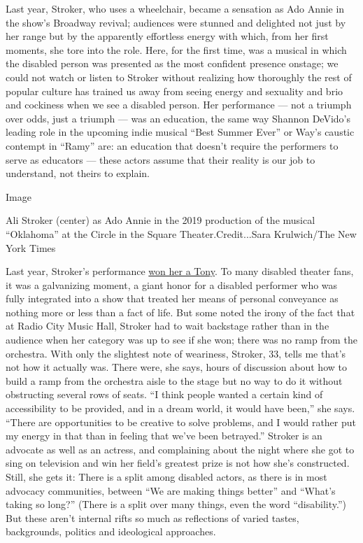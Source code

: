 Last year, Stroker, who uses a wheelchair, became a sensation as Ado
Annie in the show's Broadway revival; audiences were stunned and
delighted not just by her range but by the apparently effortless energy
with which, from her first moments, she tore into the role. Here, for
the first time, was a musical in which the disabled person was presented
as the most confident presence onstage; we could not watch or listen to
Stroker without realizing how thoroughly the rest of popular culture has
trained us away from seeing energy and sexuality and brio and cockiness
when we see a disabled person. Her performance --- not a triumph over
odds, just a triumph --- was an education, the same way Shannon DeVido's
leading role in the upcoming indie musical ``Best Summer Ever'' or Way's
caustic contempt in ``Ramy'' are: an education that doesn't require the
performers to serve as educators --- these actors assume that their
reality is our job to understand, not theirs to explain.

Image

Ali Stroker (center) as Ado Annie in the 2019 production of the musical
``Oklahoma'' at the Circle in the Square Theater.Credit...Sara
Krulwich/The New York Times

Last year, Stroker's performance
\href{https://www.nytimes3xbfgragh.onion/2019/06/12/theater/ali-stroker-oklahoma-tony.html}{won
her a Tony}. To many disabled theater fans, it was a galvanizing moment,
a giant honor for a disabled performer who was fully integrated into a
show that treated her means of personal conveyance as nothing more or
less than a fact of life. But some noted the irony of the fact that at
Radio City Music Hall, Stroker had to wait backstage rather than in the
audience when her category was up to see if she won; there was no ramp
from the orchestra. With only the slightest note of weariness, Stroker,
33, tells me that's not how it actually was. There were, she says, hours
of discussion about how to build a ramp from the orchestra aisle to the
stage but no way to do it without obstructing several rows of seats. ``I
think people wanted a certain kind of accessibility to be provided, and
in a dream world, it would have been,'' she says. ``There are
opportunities to be creative to solve problems, and I would rather put
my energy in that than in feeling that we've been betrayed.'' Stroker is
an advocate as well as an actress, and complaining about the night where
she got to sing on television and win her field's greatest prize is not
how she's constructed. Still, she gets it: There is a split among
disabled actors, as there is in most advocacy communities, between ``We
are making things better'' and ``What's taking so long?'' (There is a
split over many things, even the word ``disability.'') But these aren't
internal rifts so much as reflections of varied tastes, backgrounds,
politics and ideological approaches.

